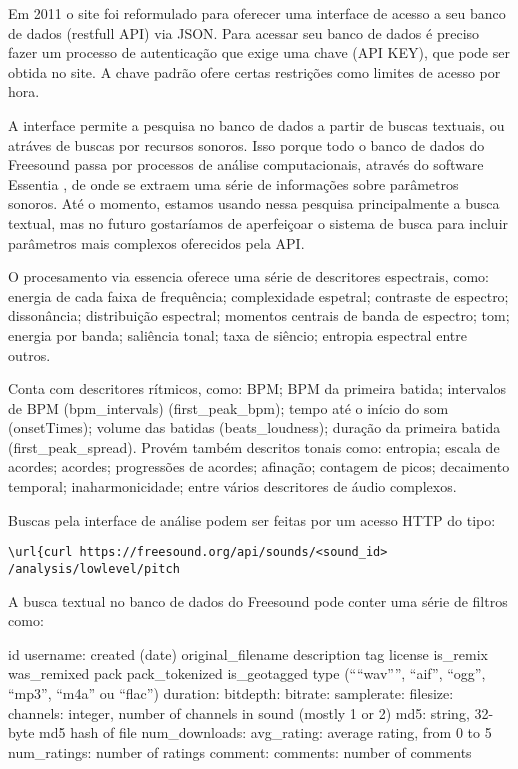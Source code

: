 Em 2011 o site foi reformulado para oferecer uma interface de acesso a seu banco de dados (restfull API) \cite{Akkermans2011} via JSON. Para acessar seu banco de dados é preciso fazer um processo de autenticação que exige uma chave (API KEY), que pode ser obtida no site. A chave padrão ofere certas restrições como limites de acesso por hora. 

A interface permite a pesquisa no banco de dados a partir de buscas textuais, ou atráves de buscas por recursos sonoros. Isso porque todo o banco de dados do Freesound passa por processos de análise computacionais, através do software Essentia \cite{Bogdanov2013}, de onde se extraem uma série de informações sobre parâmetros sonoros. Até o momento, estamos usando nessa pesquisa principalmente a busca textual, mas no futuro gostaríamos de aperfeiçoar o sistema de busca para incluir parâmetros mais complexos oferecidos pela API.

O procesamento via essencia oferece uma série de descritores espectrais, como: energia de cada faixa de frequência; complexidade espetral; contraste de espectro; dissonância; distribuição espectral; momentos centrais de banda de espectro; tom; energia por banda; saliência tonal; taxa de siêncio; entropia espectral entre outros.

Conta com descritores rítmicos, como: BPM; BPM da primeira batida; intervalos de BPM (bpm\_intervals) (first\_peak\_bpm); tempo até o início do som (onsetTimes); volume das batidas (beats\_loudness); duração da primeira batida (first\_peak\_spread). Provém também descritos tonais como: entropia; escala de acordes; acordes; progressões de acordes; afinação; contagem de picos; decaimento temporal; inaharmonicidade; entre vários descritores de áudio complexos.

Buscas pela interface de análise podem ser feitas por um acesso HTTP do tipo:

\begin{verbatim}
\url{curl https://freesound.org/api/sounds/<sound_id>
/analysis/lowlevel/pitch
\end{verbatim}

A busca textual no banco de dados do Freesound pode conter uma série de filtros como:

id	
username:	
created	(date)
original\_filename
description
tag
license
is\_remix
was\_remixed
pack
pack\_tokenized
is\_geotagged
type (“``wav”'', ``aif'', ``ogg'', ``mp3'', ``m4a'' ou ``flac'')
duration:	
bitdepth:	
bitrate:	
samplerate:	
filesize:	
channels:	integer, number of channels in sound (mostly 1 or 2)
md5:	string, 32-byte md5 hash of file
num_downloads:	
avg_rating:	 average rating, from 0 to 5
num_ratings: number of ratings
comment:	
comments:	number of comments

